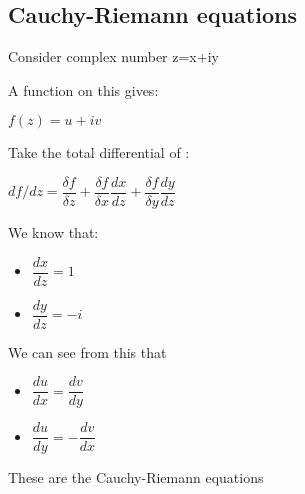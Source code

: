 
\subsection{Cauchy-Riemann equations}

Consider complex number z=x+iy

A function on this gives:

\(f(z)=u+iv\)

Take the total differential of :

\(df/dz=\dfrac{\delta f}{\delta z}+\dfrac{\delta f}{\delta x}\dfrac{dx}{dz}+\dfrac{\delta f}{\delta y}\dfrac{dy}{dz}\)

We know that:

\begin{itemize}
\item \(\dfrac{dx}{dz}=1\)
\item \(\dfrac{dy}{dz}=-i\)
\end{itemize}

We can see from this that

\begin{itemize}
\item \(\dfrac{du}{dx}=\dfrac{dv}{dy}\)
\item \(\dfrac{du}{dy}=-\dfrac{dv}{dx}\)
\end{itemize}

These are the Cauchy-Riemann equations

